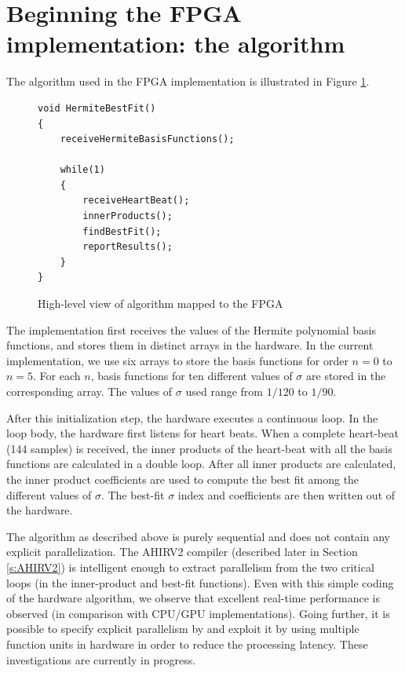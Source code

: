 \documentclass[conference]{IEEEtran}
\begin{document}
\section{Beginning the FPGA implementation: the algorithm} \label{s:algorithm}

The algorithm used in the FPGA implementation is illustrated in 
Figure \ref{fig:FpgaAlgo}.
\begin{figure}
\begin{centering}
\small\begin{verbatim}
void HermiteBestFit()
{  
    receiveHermiteBasisFunctions();

    while(1)
    {
        receiveHeartBeat();
        innerProducts();
        findBestFit();
        reportResults();
    }
}
\end{verbatim}
\normalsize
\end{centering}
\caption{High-level view of algorithm mapped to the FPGA}
\label{fig:FpgaAlgo}
\end{figure}

The implementation first receives the values of the Hermite polynomial basis
functions, and  stores them in distinct arrays in the hardware.  In the
current implementation, we use six
arrays to store the basis functions for order $n=0$ to $n=5$.  For each
$n$, basis functions for ten different values of $\sigma$ are stored in the corresponding
array.  The values of $\sigma$ used range from $1/120$ to $1/90$.

After this initialization step, the hardware executes a continuous loop.  
In the loop body, the hardware first listens for heart beats. When
a complete heart-beat (144 samples) is received, the inner products of the
heart-beat with all the basis functions are calculated in a double loop.  
After all inner products are calculated, the inner product coefficients
are used to compute the best fit among the different values of $\sigma$.
The best-fit $\sigma$ index and coefficients
are then written out of the hardware. 

The algorithm as described above is purely sequential
and does not contain any explicit parallelization.  The AHIRV2 compiler
(described later in Section \ref{s:AHIRV2}) is intelligent enough to extract 
parallelism from the two critical loops (in the inner-product and best-fit functions).
Even with this simple coding of the hardware algorithm,
we observe that excellent real-time performance
is observed (in comparison with CPU/GPU implementations).
Going further, it is possible to specify explicit parallelism by
and exploit it by using multiple function units in hardware
in order to reduce the processing latency.  These investigations
are currently in progress.
\end{document}
